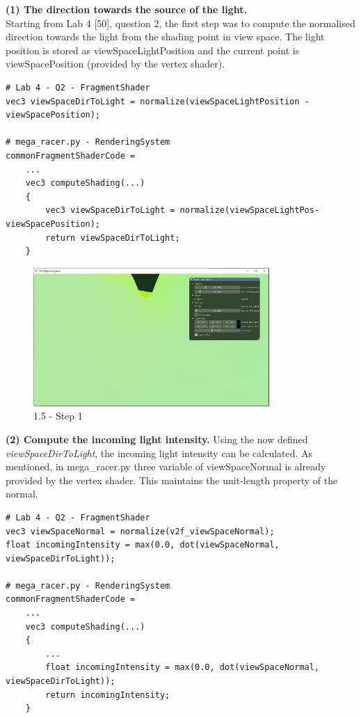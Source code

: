 \documentclass[a4 paper, 12pt]{article}
\begin{document}
\textbf{(1) The direction towards the source of the light.} \\
Starting from Lab 4 [50], question 2, the first step was to compute the normalised direction towards the light from the shading point in view space. The light position is stored as viewSpaceLightPosition and the current point is viewSpacePosition (provided by the vertex shader). 
    \begin{lstlisting}
# Lab 4 - Q2 - FragmentShader
vec3 viewSpaceDirToLight = normalize(viewSpaceLightPosition - viewSpacePosition);
    
# mega_racer.py - RenderingSystem
commonFragmentShaderCode =
    ...
    vec3 computeShading(...)
    {
        vec3 viewSpaceDirToLight = normalize(viewSpaceLightPos- viewSpacePosition);
        return viewSpaceDirToLight;
    }
    \end{lstlisting}

    \begin{figure} [H]
        \centering
        \includegraphics[width=0.8\textwidth, frame]
            {./images/mega_racer/1.5_a.PNG}
        \caption{1.5 - Step 1}
    \end{figure}

\textbf{(2) Compute the incoming light intensity.}
Using the now defined \textit{viewSpaceDirToLight}, the incoming light intensity can be calculated. As mentioned, in mega\_racer.py three variable of viewSpaceNormal is already provided by the vertex shader. This maintains the unit-length property of the normal.
    \begin{lstlisting}
# Lab 4 - Q2 - FragmentShader
vec3 viewSpaceNormal = normalize(v2f_viewSpaceNormal);
float incomingIntensity = max(0.0, dot(viewSpaceNormal, viewSpaceDirToLight));

# mega_racer.py - RenderingSystem
commonFragmentShaderCode =
    ...
    vec3 computeShading(...)
    {
        ...
        float incomingIntensity = max(0.0, dot(viewSpaceNormal, viewSpaceDirToLight));
        return incomingIntensity;
    }
    \end{lstlisting}
\end{document}
